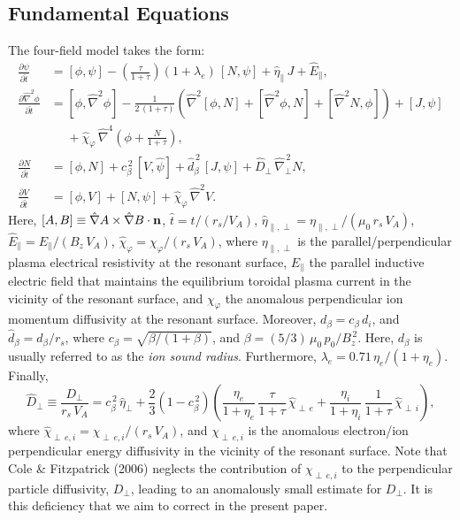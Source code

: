 \documentclass[12pt,prb,aps]{revtex4-1}
\begin{document}
\subsection{Fundamental Equations}
The four-field model takes the form:\cite{fw}
\begin{align}
\frac{\partial\psi}{\partial\hat{t}}&= [\phi,\psi] -\left(\frac{\tau}{1+\tau}\right)(1+\lambda_e)\,[N,\psi]
+\hat{\eta}_\parallel\,J + \hat{E}_\parallel,\\[0.5ex]
\frac{\partial \hat{\nabla}^2\phi}{\partial \hat{t}}&= [\phi,\hat{\nabla}^2\phi] - \frac{1}{2\,(1+\tau)}\left(\hat{\nabla}^2[\phi,N] + [\hat{\nabla}^2\phi,N] + [\hat{\nabla}^2 N,\phi]\right) + [J,\psi] \nonumber\\[0.5ex]&\phantom{=}+\hat{\chi}_\varphi  \,\hat{\nabla}^4\!\left(\phi + \frac{N}{1+\tau}\right), \\[0.5ex]
\frac{\partial N}{\partial \hat{t}}&= [\phi,N] +c_\beta^{\,2}\,[V,\hat{\psi}] +\hat{d}_\beta^{\,2}\,[J,\psi]
+ \hat{D}_\perp\,\hat{\nabla}_\perp^{\,2}N,\\[0.5ex]
\frac{\partial V}{\partial\hat{t}}&= [\phi,V] +[N,\psi] + \hat{\chi}_\varphi\,\hat{\nabla}^2 V.\label{e21}
\end{align}
Here, $[A,B]\equiv \hat{\nabla} A\times \hat{\nabla} B\cdot {\bf n}$, $\hat{t} = t/(r_s/V_A)$, $\hat{\eta}_{\parallel,\perp} = \eta_{\parallel,\perp}/(\mu_0\,r_s\,V_A)$, $\hat{E}_\parallel = E_\parallel/(B_z\,V_A)$, 
$\hat{\chi}_\varphi= \chi_\varphi/(r_s\,V_A)$, where $\eta_{\parallel,\perp}$ is the parallel/perpendicular plasma electrical
resistivity at the resonant surface, $E_\parallel$ the parallel inductive electric field that maintains the equilibrium toroidal
plasma current in the vicinity of the resonant surface, and $\chi_\varphi$  the anomalous perpendicular ion momentum
diffusivity at the resonant surface. 
Moreover, $d_\beta=c_\beta\,d_i$, and $\hat{d}_\beta=d_\beta/r_s$, where $c_\beta = \sqrt{\beta/(1+\beta)}$, and
$\beta=(5/3)\,\mu_0\,p_0/B_z^{\,2}$. Here, $d_\beta$ is usually referred to as the {\em ion sound radius}. Furthermore,
$\lambda_e=0.71\,\eta_e/(1+\eta_e)$. Finally,\cite{fw}
\begin{equation}
\hat{D}_\perp \equiv \frac{D_{\perp}}{r_s\,V_A}= c_\beta^{\,2}\,\hat{\eta}_\perp +  \frac{2}{3}\left(1-c_\beta^{\,2}\right)\!\left(\frac{\eta_e}{1+\eta_e}\,\frac{\tau}{1+\tau}\,\hat{\chi}_{\perp\,e} + \frac{\eta_i}{1+\eta_i}\,\frac{1}{1+\tau}\,\hat{\chi}_{\perp\,i}\right),
\end{equation}
where $\hat{\chi}_{\perp\,e,i}=\chi_{\perp\,e,i}/(r_s\,V_A)$, and $\chi_{\perp\,e,i}$ is the anomalous
electron/ion perpendicular energy diffusivity in the vicinity of the resonant surface. 
Note that Cole \& Fitzpatrick (2006) neglects the contribution of $\chi_{\perp\,e,i}$ to the perpendicular particle
diffusivity, $D_\perp$, leading to an anomalously small estimate for $D_\perp$. It is this deficiency that we aim to
correct in the present paper. 
\end{document}
